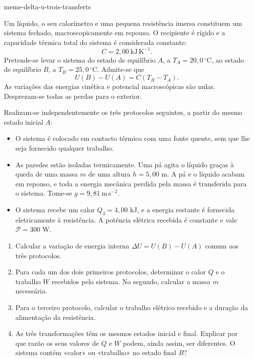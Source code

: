 \begin{exo}{meme-delta-u-trois-transferts}

Um líquido, o seu calorímetro e uma pequena resistência imersa constituem um
sistema fechado, macroscopicamente em repouso. O recipiente é rígido e a
capacidade térmica total do sistema é considerada constante:
\[C=2{,}00\ \mathrm{kJ\,K^{-1}}.\]
Pretende-se levar o sistema do estado de equilíbrio $A$, a
$T_A=20{,}0\,^\circ\mathrm{C}$, ao estado de equilíbrio $B$, a
$T_B=25{,}0\,^\circ\mathrm{C}$. Admite-se que
\[U(B)-U(A)=C(T_B-T_A).\]
As variações das energias cinética e potencial macroscópicas são nulas.
Desprezam-se todas as perdas para o exterior.

Realizam-se independentemente os três protocolos seguintes, a partir do mesmo
estado inicial $A$:
\begin{itemize}
\item[Protocolo 1] O sistema é colocado em contacto térmico com uma fonte quente, sem que lhe seja fornecido qualquer trabalho.
\item[Protocolo 2] As paredes estão isoladas termicamente. Uma pá agita o líquido graças à queda de uma massa $m$ de uma altura $h=5{,}00$ m. A pá e o líquido acabam em repouso, e toda a energia mecânica perdida pela massa é transferida para o sistema. Tome-se $g=9{,}81\ \mathrm{m\,s^{-2}}$.
\item[Protocolo 3] O sistema recebe um calor $Q_3=4{,}00$ kJ, e a energia restante é fornecida eletricamente à resistência. A potência elétrica recebida é constante e vale $\mathcal P=300$ W.
\end{itemize}

\begin{enumerate}
\item Calcular a variação de energia interna $\Delta U=U(B)-U(A)$ comum aos três protocolos.
\item Para cada um dos dois primeiros protocolos, determinar o calor $Q$ e o trabalho $W$ recebidos pelo sistema. No segundo, calcular a massa $m$ necessária.
\item Para o terceiro protocolo, calcular o trabalho elétrico recebido e a duração da alimentação da resistência.
\item As três transformações têm os mesmos estados inicial e final. Explicar por que razão os seus valores de $Q$ e $W$ podem, ainda assim, ser diferentes. O sistema contém «calor» ou «trabalho» no estado final $B$?
\end{enumerate}


\end{exo}
